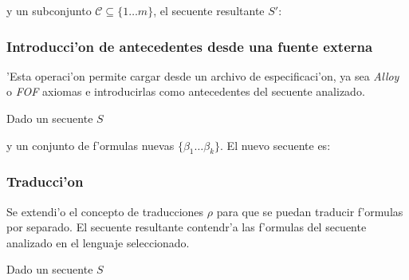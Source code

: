 \begin{prooftree}
\end{prooftree}

y un subconjunto $\mathcal{C} \subseteq \{1 \ldots m\}$, el secuente resultante $S'$:

\begin{prooftree}
\end{prooftree}


\subsubsection{Introducci'on de antecedentes desde una fuente externa}

'Esta operaci'on permite cargar desde un archivo de especificaci'on, ya sea \textit{Alloy} o \textit{FOF} axiomas e introducirlas como antecedentes del secuente analizado.

Dado un secuente $S$

\begin{prooftree}
\end{prooftree}

y un conjunto de f'ormulas nuevas $\{\beta_1 \ldots \beta_k\}$. El nuevo secuente es:

\begin{prooftree}
\end{prooftree}

\subsubsection{Traducci'on}

Se extendi'o el concepto de traducciones $\rho$ para que se puedan traducir f'ormulas por separado. El secuente resultante contendr'a las f'ormulas del secuente analizado en el lenguaje seleccionado.

Dado un secuente $S$

\begin{prooftree}
\end{prooftree}

